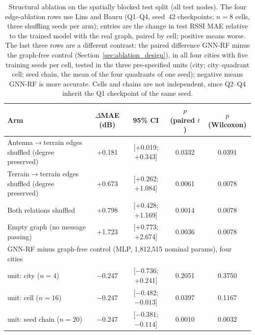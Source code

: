 \begin{table}[t]
\caption{Structural ablation on the spatially blocked test split (all test nodes). The four edge-ablation rows use Lins and Bauru (Q1--Q4, seed~42 checkpoints; $n=8$ cells, three shuffling seeds per arm); entries are the change in test RSSI MAE relative to the trained model with the real graph, paired by cell; positive means worse. The last three rows are a different contrast: the paired difference GNN-RF minus the graph-free control (Section~\ref{sec:ablation_design}), in all four cities with five training seeds per cell, tested in the three pre-specified units (city; city--quadrant cell; seed chain, the mean of the four quadrants of one seed); negative means GNN-RF is more accurate. Cells and chains are not independent, since Q2--Q4 inherit the Q1 checkpoint of the same seed.}
\label{tab:structural_ablation}
\centering
\begin{tabular}{lccc c}
\toprule
Arm & $\Delta$MAE (dB) & 95\% CI & $p$ (paired $t$) & $p$ (Wilcoxon) \\
\midrule
Antenna$\to$terrain edges shuffled (degree preserved) & +0.181 & [+0.019; +0.343] & 0.0332 & 0.0391 \\
Terrain$\to$terrain edges shuffled (degree preserved) & +0.673 & [+0.262; +1.084] & 0.0061 & 0.0078 \\
Both relations shuffled & +0.798 & [+0.428; +1.169] & 0.0014 & 0.0078 \\
Empty graph (no message passing) & +1.723 & [+0.773; +2.674] & 0.0036 & 0.0078 \\
\midrule
\multicolumn{5}{l}{GNN-RF minus graph-free control (MLP, 1{,}812{,}515 nominal params), four cities} \\
\quad unit: city ($n=4$) & $-0.247$ & [$-0.736$; +0.241] & 0.2051 & 0.3750 \\
\quad unit: cell ($n=16$) & $-0.247$ & [$-0.482$; $-0.013$] & 0.0397 & 0.1167 \\
\quad unit: seed chain ($n=20$) & $-0.247$ & [$-0.381$; $-0.114$] & 0.0010 & 0.0032 \\
\bottomrule
\end{tabular}
\end{table}

